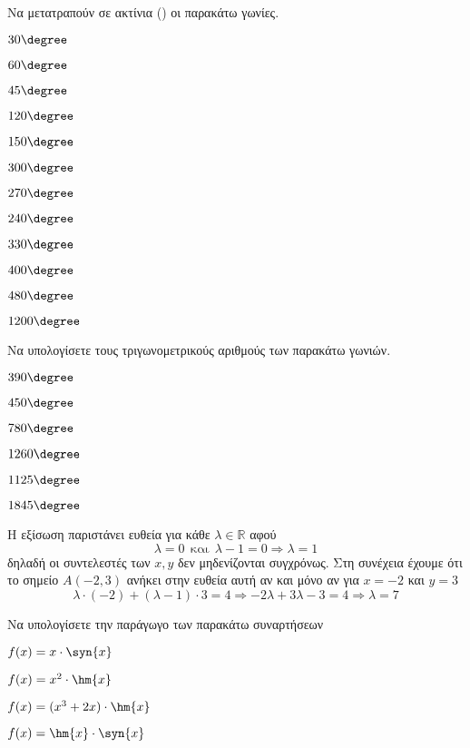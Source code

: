 Να μετατραπούν σε ακτίνια () οι παρακάτω γωνίες.
\begin{multicols}{3}
\begin{alist}
\item $ 30\degree $
\item $ 60\degree $
\item $ 45\degree $
\item $ 120\degree $
\item $ 150\degree $
\item $ 300\degree $
\item $ 270\degree $
\item $ 240\degree $
\item $ 330\degree $
\item $ 400\degree $
\item $ 480\degree $
\item $ 1200\degree $
\end{alist}
\end{multicols}

Να υπολογίσετε τους τριγωνομετρικούς αριθμούς των παρακάτω γωνιών.
\begin{multicols}{3}
\begin{rlist}
\item $ 390\degree $
\item $ 450\degree $
\item $ 780\degree $
\item $ 1260\degree $
\item $ 1125\degree $
\item $ 1845\degree $
\end{rlist}
\end{multicols}


Η εξίσωση παριστάνει ευθεία για κάθε $ \lambda\in\mathbb{R} $ αφού
\[ \lambda=0\ \ \text{και}\ \ \lambda-1=0\Rightarrow\lambda=1 \]
δηλαδή οι συντελεστές των $ x,y $ δεν μηδενίζονται συγχρόνως. Στη συνέχεια έχουμε ότι το σημείο $ A(-2,3) $ ανήκει στην ευθεία αυτή αν και μόνο αν για $ x=-2 $ και $ y=3 $
\[ \lambda\cdot(-2)+(\lambda-1)\cdot 3=4\Rightarrow -2\lambda+3\lambda-3=4\Rightarrow \lambda=7 \]

Να υπολογίσετε την παράγωγο των παρακάτω συναρτήσεων
\begin{alist}
\item $ f(x)=x\cdot\syn{x} $
\item $ f(x)=x^2\cdot\hm{x} $
\item $ f(x)=(x^3+2x)\cdot\hm{x} $
\item $ f(x)=\hm{x}\cdot\syn{x} $
\end{alist}

